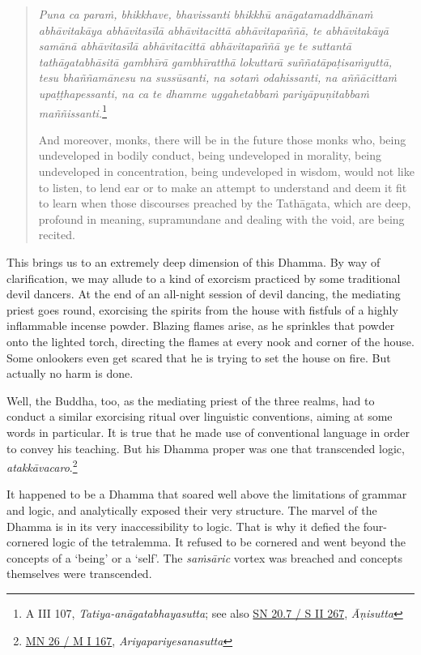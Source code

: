\begin{quote}
\emph{Puna ca paraṁ, bhikkhave, bhavissanti bhikkhū anāgatamaddhānaṁ abhāvitakāya abhāvitasīlā abhāvitacittā abhāvitapaññā, te abhāvitakāyā samānā abhāvitasīlā abhāvitacittā abhāvitapaññā ye te suttantā tathāgatabhāsitā gambhīrā gambhīratthā lokuttarā suññatāpaṭisaṁyuttā, tesu bhaññamānesu na sussūsanti, na sotaṁ odahissanti, na aññācittaṁ upaṭṭhapessanti, na ca te dhamme uggahetabbaṁ pariyāpuṇitabbaṁ maññissanti.}\footnote{A III 107, \emph{Tatiya-anāgatabhayasutta}; see also \href{https://suttacentral.net/sn20.7/pli/ms}{SN 20.7 / S II 267}, \emph{Āṇisutta}}

And moreover, monks, there will be in the future those monks who, being undeveloped in bodily conduct, being undeveloped in morality, being undeveloped in concentration, being undeveloped in wisdom, would not like to listen, to lend ear or to make an attempt to understand and deem it fit to learn when those discourses preached by the Tathāgata, which are deep, profound in meaning, supramundane and dealing with the void, are being recited.
\end{quote}

This brings us to an extremely deep dimension of this Dhamma. By way of clarification, we may allude to a kind of exorcism practiced by some traditional devil dancers. At the end of an all-night session of devil dancing, the mediating priest goes round, exorcising the spirits from the house with fistfuls of a highly inflammable incense powder. Blazing flames arise, as he sprinkles that powder onto the lighted torch, directing the flames at every nook and corner of the house. Some onlookers even get scared that he is trying to set the house on fire. But actually no harm is done.

Well, the Buddha, too, as the mediating priest of the three realms, had to conduct a similar exorcising ritual over linguistic conventions, aiming at some words in particular. It is true that he made use of conventional language in order to convey his teaching. But his Dhamma proper was one that transcended logic, \emph{atakkāvacaro}.\footnote{\href{https://suttacentral.net/mn26/pli/ms}{MN 26 / M I 167}, \emph{Ariyapariyesanasutta}}

It happened to be a Dhamma that soared well above the limitations of grammar and logic, and analytically exposed their very structure. The marvel of the Dhamma is in its very inaccessibility to logic. That is why it defied the four-cornered logic of the tetralemma. It refused to be cornered and went beyond the concepts of a `being' or a `self'. The \emph{saṁsāric} vortex was breached and concepts themselves were transcended.

